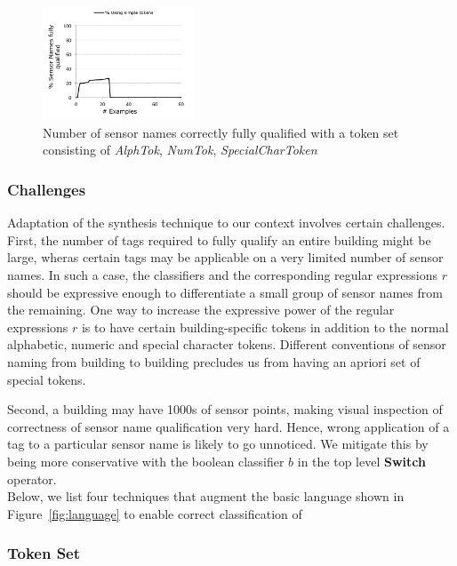 \begin{figure}[h!]
  
  \centering
    \includegraphics[width=0.40\textwidth]{figs/gulwani-noconverge.pdf}
\caption{Number of sensor names correctly fully qualified with a token set consisting of {\it AlphTok}, {\it NumTok}, {\it SpecialCharToken}}
\label{fig:simpleTokenNoCoverage}
\end{figure}

\subsubsection{Challenges}

Adaptation of the synthesis technique to our context involves certain challenges. First, the number of tags required to fully qualify an entire building might be large, wheras certain tags may be applicable on a very limited number of sensor names. In such a case, the classifiers and the corresponding regular expressions $r$ should be expressive enough to differentiate a small group of sensor names from the remaining. One way to increase the expressive power of the regular expressions $r$ is to have certain building-specific tokens in addition to the normal alphabetic, numeric and special character tokens. Different conventions of sensor naming from building to building precludes us from having an apriori set of special tokens.

Second, a building may have 1000s of sensor points, making visual inspection of correctness of sensor name qualification very hard. Hence, wrong application of a tag to a particular sensor name is likely to go unnoticed. We mitigate this by being more conservative with the boolean classifier $b$ in the top level {\bf Switch} operator. \\


Below, we list four techniques that augment the basic language shown in Figure~\ref{fig:language} to enable correct classification of 

\subsubsection{Token Set}

